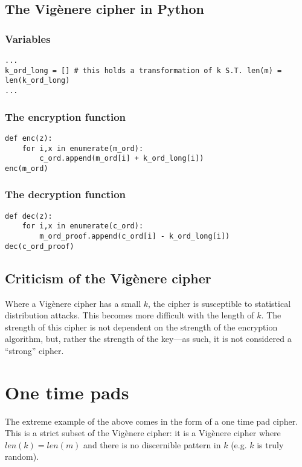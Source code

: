 \documentclass{AIAA}
\begin{document}
\subsection{The Vig\`enere cipher in Python}

\subsubsection{Variables}

\begin{verbatim}
...
k_ord_long = [] # this holds a transformation of k S.T. len(m) = len(k_ord_long)
...
\end{verbatim}

\subsubsection{The encryption function}

\begin{verbatim}
def enc(z):
    for i,x in enumerate(m_ord):
        c_ord.append(m_ord[i] + k_ord_long[i])
enc(m_ord)
\end{verbatim}

\subsubsection{The decryption function}

\begin{verbatim}
def dec(z):
    for i,x in enumerate(c_ord):
        m_ord_proof.append(c_ord[i] - k_ord_long[i])
dec(c_ord_proof)
\end{verbatim}

\subsection{Criticism of the Vig\`enere cipher}
Where a Vig\`enere cipher has a small $k$, the cipher is susceptible to statistical distribution attacks. This becomes more difficult with the length of $k$. The strength of this cipher is not dependent on the strength of the encryption algorithm, but, rather the strength of the key---as such, it is not considered a ``strong'' cipher.

\section{One time pads}
The extreme example of the above comes in the form of a one time pad cipher. This is a strict subset of the Vig\`enere cipher: it is a Vig\`enere cipher where $len(k) = len(m)$ and there is no discernible pattern in $k$ (e.g. $k$ is truly random).
\end{document}
